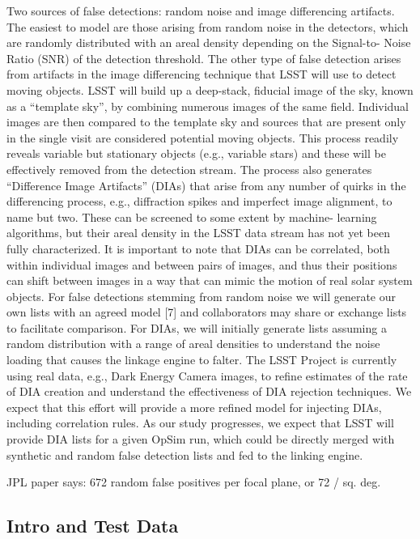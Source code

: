 Two sources of false detections: random noise and image differencing artifacts. The easiest to model are those arising from random noise in the detectors, which are randomly distributed with an areal density depending on the Signal-to- Noise Ratio (SNR) of the detection threshold.
The other type of false detection arises from artifacts in the image differencing technique that LSST will use to detect moving objects. LSST will build up a deep-stack, fiducial image of the sky, known as a ``template sky'', by combining numerous images of the same field. Individual images are then compared to the template sky and sources that are present only in the single visit are considered potential moving objects. This process readily reveals variable but stationary objects (e.g., variable stars) and these will be effectively removed from the detection stream. The process also generates ``Difference Image Artifacts'' (DIAs) that arise from any number of quirks in the differencing process, e.g., diffraction spikes and imperfect image alignment, to name but two. These can be screened to some extent by machine- learning algorithms, but their areal density in the LSST data stream has not yet been fully characterized. It is important to note that DIAs can be correlated, both within individual images and between pairs of images, and thus their positions can shift between images in a way that can mimic the motion of real solar system objects.
For false detections stemming from random noise we will generate our own lists with an agreed model [7] and collaborators may share or exchange lists to facilitate comparison. For DIAs, we will initially generate lists assuming a random distribution with a range of areal densities to understand the noise loading that causes the linkage engine to falter. The LSST Project is currently using real data, e.g., Dark Energy Camera images, to refine estimates of the rate of DIA creation and understand the effectiveness of DIA rejection techniques. We expect that this effort will provide a more refined model for injecting DIAs, including correlation rules. As our study progresses, we expect that LSST will provide DIA lists for a given OpSim run, which could be directly merged with synthetic and random false detection lists and fed to the linking engine.


JPL paper says: 672 random false positives per focal plane, or 72 / sq. deg. 


\subsection{Intro and Test Data}

